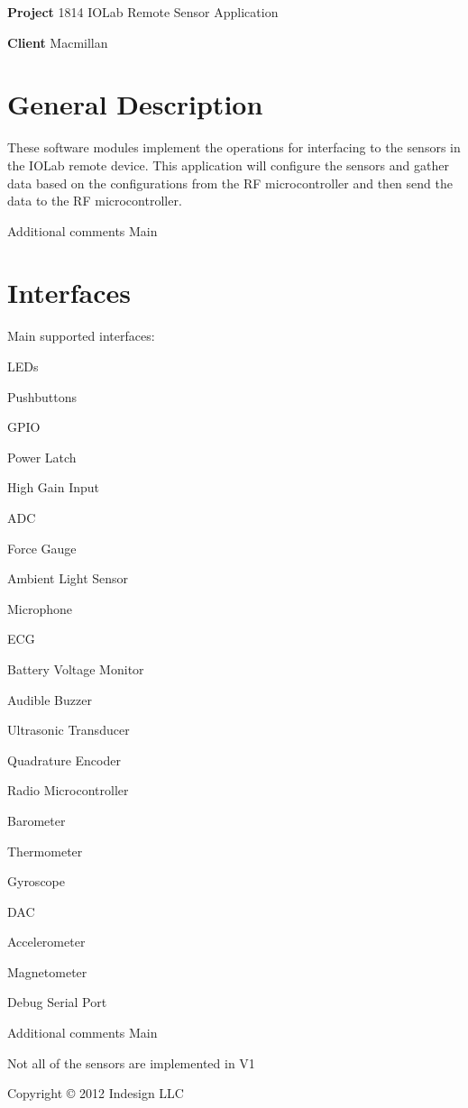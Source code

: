 {\bfseries Project} 1814 I\-O\-Lab Remote Sensor Application

{\bfseries Client} Macmillan\hypertarget{index_general_desc}{}\section{General Description}\label{index_general_desc}
These software modules implement the operations for interfacing to the sensors in the I\-O\-Lab remote device. This application will configure the sensors and gather data based on the configurations from the R\-F microcontroller and then send the data to the R\-F microcontroller.

Additional comments Main\hypertarget{index_interfaces_desc}{}\section{Interfaces}\label{index_interfaces_desc}
Main supported interfaces\-:
\begin{DoxyItemize}
\item L\-E\-Ds
\item Pushbuttons
\item G\-P\-I\-O
\item Power Latch
\item High Gain Input
\item A\-D\-C
\item Force Gauge
\item Ambient Light Sensor
\item Microphone
\item E\-C\-G
\item Battery Voltage Monitor
\item Audible Buzzer
\item Ultrasonic Transducer
\item Quadrature Encoder
\item Radio Microcontroller
\item Barometer
\item Thermometer
\item Gyroscope
\item D\-A\-C
\item Accelerometer
\item Magnetometer
\item Debug Serial Port
\end{DoxyItemize}

Additional comments Main
\begin{DoxyItemize}
\item Not all of the sensors are implemented in V1
\end{DoxyItemize}

Copyright \copyright{} 2012 Indesign L\-L\-C 